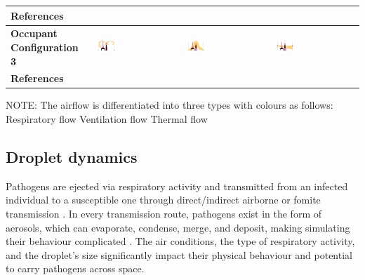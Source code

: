 \documentclass[a4paper,12pt]{elsarticle}
\DeclareRobustCommand{\legendsquare}[1]{%
  \tikz[baseline=(a.south)]{\node[#1, inner sep=.8ex, outer sep=0] (a) {};}%
  }
\begin{document}
\begin{table}[ht]
\begin{tabular}{|m{2.5cm}|m{4cm}|m{4cm}|m{4cm}|}
    \hline
    \textbf{References} & \cite{he2011cfd,yan2021transmission,mirzaie2021covid,li2021effects,shao2021risk,qin2023transmission,xu2023cfd} & \cite{he2011cfd,lu2022ventilation,jain2023numerical} & \cite{ho2021modeling,duill2021impact,ren2022practical,lu2022ventilation} \\
    \hline
    \textbf{Occupant Configuration 3} &\includegraphics[clip,trim={0 2cm 0 2cm},width=0.25\textwidth]{Airflow/mat3.jpeg}& \includegraphics[clip,trim={0 2cm 0 2cm},width=0.25\textwidth]{Airflow/mat6.jpeg}& \includegraphics[clip,trim={0 2cm 0 2cm},width=0.25\textwidth]{Airflow/mat9.jpeg} \\
    \hline
    \textbf{References} & \cite{hang2014influence,romano2015numerical,liu2020full,lu2020reducing,zhou2021experimental,guo2022visualization,liu2023estimating} & \cite{zhou2021experimental,villafruela2019assessment,lu2020reducing} & \cite{jiang2009investigating,lu2020reducing} \\
    \hline
    \end{tabular}
        NOTE: The airflow is differentiated into three types with colours as follows: \legendsquare{fill=resp} Respiratory flow \legendsquare{fill=vent} Ventilation flow \legendsquare{fill=therm} Thermal flow 
\end{table}

    
\subsection{Droplet dynamics}

Pathogens are ejected via respiratory activity and transmitted from an infected individual to a susceptible one through direct/indirect airborne or fomite transmission \cite{leung2021transmissibility}. In every transmission route, pathogens exist in the form of aerosols, which can evaporate, condense, merge, and deposit, making simulating their behaviour complicated \cite{rosti2020fluid,zhou2021dynamical}. The air conditions, the type of respiratory activity, and the droplet's size significantly impact their physical behaviour and potential to carry pathogens across space.
\end{document}
